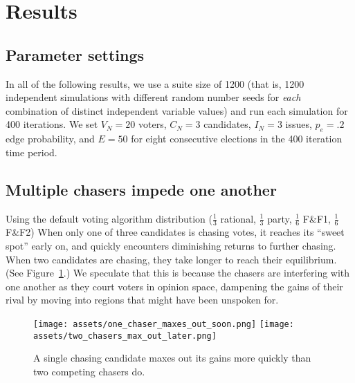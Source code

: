 \section{Results}
\label{sec:results}

\subsection{Parameter settings}

In all of the following results, we use a suite size of 1200 (that is, 1200
independent simulations with different random number seeds for \textit{each}
combination of distinct independent variable values) and run each simulation
for 400 iterations. We set $V_N=20$ voters, $C_N=3$ candidates, $I_N=3$ issues,
$p_e=.2$ edge probability, and $E=50$ for eight consecutive elections in the
400 iteration time period.

\subsection{Multiple chasers impede one another}

Using the default voting algorithm distribution ($\frac{1}{3}$ rational,
$\frac{1}{3}$ party, $\frac{1}{6}$ F\&F1, $\frac{1}{6}$ F\&F2)
When only one of three candidates is chasing votes, it reaches its ``sweet
spot'' early on, and quickly encounters diminishing returns to further chasing.
When two candidates are chasing, they take longer to reach their equilibrium.
(See Figure~\ref{one_vs_two_chasers}.) We speculate that this is because the
chasers are interfering with one another as they court voters in opinion space,
dampening the gains of their rival by moving into regions that might have been
unspoken for.

\begin{figure}[ht]
\centering
\texttt{[image: assets/one\_chaser\_maxes\_out\_soon.png]}
\texttt{[image: assets/two\_chasers\_max\_out\_later.png]}
\caption{A single chasing candidate maxes out its gains more quickly than two
competing chasers do.}
\label{one_vs_two_chasers}
\end{figure}

